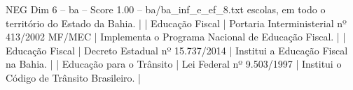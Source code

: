 \begin{textsample}{NEG Dim 6 – ba – Score 1.00 – ba/ba\_inf\_e\_ef\_8.txt}
escolas, em todo o território do Estado da Bahia. | | Educação Fiscal | Portaria Interministerial nº 413/2002 MF/MEC | Implementa o Programa Nacional de Educação Fiscal. | | Educação Fiscal | Decreto Estadual nº 15.737/2014 | Institui a Educação Fiscal na Bahia. | | Educação para o Trânsito | Lei Federal nº 9.503/1997 | Institui o Código de Trânsito Brasileiro. |

\end{textsample}
